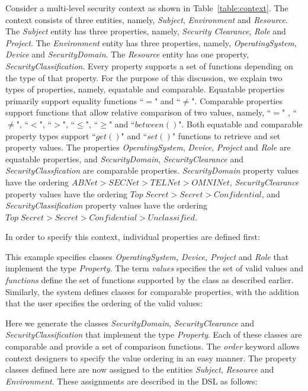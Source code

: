 Consider a multi-level security context as shown in Table~\ref{table:context}. The context consists of three entities, namely, {\em Subject}, {\em Environment} and {\em Resource}. The {\em Subject} entity has three properties, namely, {\em Security Clearance}, {\em Role} and {\em Project}.  The {\em Environment} entity has three properties, namely, {\em OperatingSystem}, {\em Device} and {\em SecurityDomain}.  The {\em Resource} entity has one property, {\em SecurityClassification}. Every property supports a set of functions depending on the type of that property.  For the purpose of this discussion, we explain two types of properties, namely, equatable and comparable.  Equatable properties primarily support equality functions  ``$=$" and ``$\ne$". Comparable properties support functions that allow relative comparison of two values, namely, ``$=$" , ``$\ne$", ``$<$", ``$>$",  ``$\leq$", ``$\geq$" and ``$between()$". Both equatable and comparable property types support ``$get()$" and ``$set()$" functions to retrieve and set property values. The properties {\em OperatingSystem}, {\em Device}, {\em Project} and {\em Role} are equatable properties, and {\em SecurityDomain}, {\em SecurityClearance} and {\em SecurityClassfication} are comparable properties. {\em SecurityDomain} property values have the ordering $ABNet > SECNet > TELNet > OMNINet$,  {\em SecurityClearance} property values have the ordering $Top\;Secret > Secret > Confidential$, and {\em SecurityClassification} property values have the ordering $Top\;Secret > Secret > Confidential > Unclassified$. 

In order to specify this context, individual properties are defined first: 


	
This example specifies classes {\em OperatingSystem, Device, Project} and {\em Role} that implement the type {\em Property}. The term {\em values} specifies the set of valid values and {\em functions} define the set of functions supported by the class as described earlier. Similarly, the system defines classes for comparable properties, with the addition that the user specifies the ordering of the valid values: 



Here we generate the classes {\em SecurityDomain}, {\em SecurityClearance} and {\em SecurityClassification} that implement the type {\em Property}. Each of these classes are comparable and provide a set of comparison functions. The {\em order} keyword allows context designers to specify the value ordering in an easy manner. The property classes defined here are now assigned to the entities {\em Subject}, {\em Resource} and {\em Environment}. These assignments are described in the DSL as follows: 

